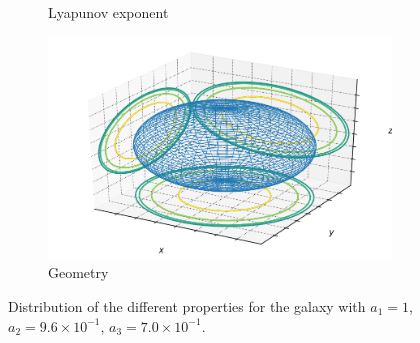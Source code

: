 \begin{figure}[h]
\begin{subfigure}[t]{0.4\textwidth}
        \caption{Lyapunov exponent}
    \end{subfigure}
    \begin{subfigure}[t]{0.4\textwidth}
        \includegraphics[width=\textwidth]{"../Files/Week 13/images/10_ellipsoid"}
        \caption{Geometry}
    \end{subfigure}
    \caption{Distribution of the different properties for the galaxy with $a_1 = 1$, $a_2 = 9.6\times10^{-1}$, $a_3 = 7.0\times10^{-1}$.}
    \label{fig: g3}
\end{figure}



